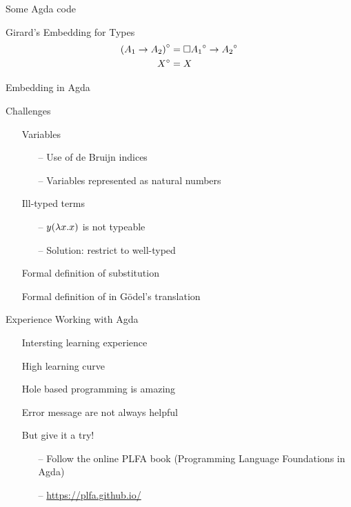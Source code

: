 \documentclass{beamer}
\theoremstyle{definition}
\begin{document}
  \begin{frame}{Some Agda code}
    \begin{block}{Girard's Embedding for Types}
      \begin{align*}
        {(A_1 \to A_2)}^\circ     & = \square{{A_1}^\circ} \to {A_2}^\circ      \\                                         
        {X}^\circ                 & = X                                         
      \end{align*}
    \end{block}
    \begin{block}{Embedding in Agda}
      
    \end{block}
  \end{frame}

  \begin{frame}{Challenges}
    \begin{itemize}
      \item[\textbullet] Variables
        \begin{itemize}
          \item[--] Use of de Bruijn indices
          \item[--] Variables represented as natural numbers
        \end{itemize}
      \item[\textbullet] Ill-typed terms
        \begin{itemize}
          \item[--] \lterm $y (\lambda {x}.{x})$ is not typeable
          \item[--] Solution: restrict to well-typed \lterms 
        \end{itemize}
      \item[\textbullet] Formal definition of substitution
      \item[\textbullet] Formal definition of \raiseembn in Gödel's translation %
    \end{itemize}
  \end{frame}

  \begin{frame}{Experience Working with Agda}
    \begin{itemize}
      \item[\textbullet] Intersting learning experience
      \item[\textbullet] High learning curve
      \item[\textbullet] Hole based programming is amazing
      \item[\textbullet] Error message are not always helpful  
      \item[\textbullet] But give it a try!
        \begin{itemize}
          \item[--] Follow the online PLFA book (Programming Language Foundations in Agda)
          \item[--] \url{https://plfa.github.io/} 
        \end{itemize}  
    \end{itemize}
  \end{frame}
\end{document}
